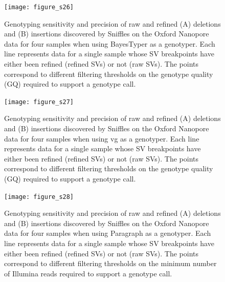 \documentclass[12pt]{article}
\newenvironment{lsfigure}
	{\begin{landscape} \begin{figure} \centering}
	{\end{figure} \end{landscape}}
\begin{document}
\clearpage%

\begin{lsfigure}
	\texttt{[image: figure\_s26]}

	\caption[Genotyping sensitivity of raw and refined Oxford Nanopore SVs for four samples using BayesTyper]{
		Genotyping sensitivity and precision of raw and refined (A) deletions and (B) insertions discovered by Sniffles on the Oxford Nanopore data for four samples when using BayesTyper as a genotyper.
		Each line represents data for a single sample whose SV breakpoints have either been refined (refined SVs) or not (raw SVs).
		The points correspond to different filtering thresholds on the genotype quality (GQ) required to support a genotype call.
	}

	\label{fig_s26}

\end{lsfigure}

\clearpage%

\begin{lsfigure}
	\texttt{[image: figure\_s27]}

	\caption[Genotyping sensitivity of raw and refined Oxford Nanopore SVs for four samples using vg]{
		Genotyping sensitivity and precision of raw and refined (A) deletions and (B) insertions discovered by Sniffles on the Oxford Nanopore data for four samples when using vg as a genotyper.
		Each line represents data for a single sample whose SV breakpoints have either been refined (refined SVs) or not (raw SVs).
		The points correspond to different filtering thresholds on the genotype quality (GQ) required to support a genotype call.
	}

	\label{fig_s27}

\end{lsfigure}

\clearpage%

\begin{lsfigure}
	\texttt{[image: figure\_s28]}

	\caption[Genotyping sensitivity of raw and refined Oxford Nanopore SVs for four samples using Paragraph]{
		Genotyping sensitivity and precision of raw and refined (A) deletions and (B) insertions discovered by Sniffles on the Oxford Nanopore data for four samples when using Paragraph as a genotyper.
		Each line represents data for a single sample whose SV breakpoints have either been refined (refined SVs) or not (raw SVs).
		The points correspond to different filtering thresholds on the minimum number of Illumina reads required to support a genotype call.
	}

	\label{fig_s28}

\end{lsfigure}

\clearpage%



\end{document}
